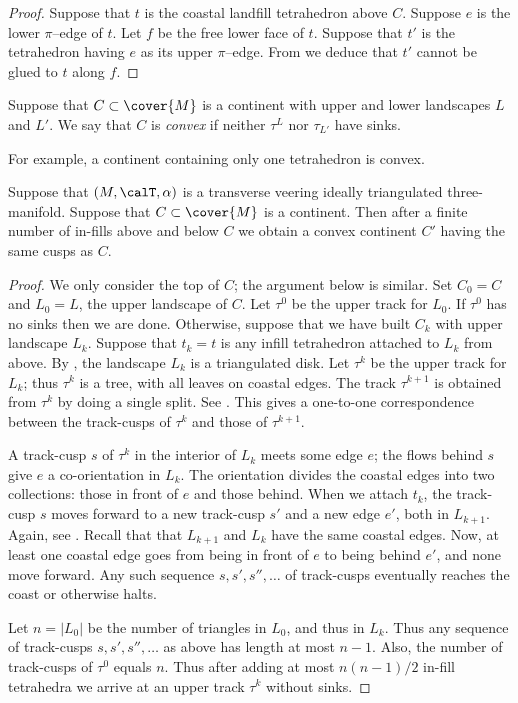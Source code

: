 \documentclass[12pt]{amsart}
\begin{document}
\begin{proof}
Suppose that $t$ is the coastal landfill tetrahedron above $C$.  Suppose $e$ is the lower $\pi$--edge of $t$.  Let $f$ be the free lower face of $t$.  Suppose that $t'$ is the tetrahedron having $e$ as its upper $\pi$--edge.  From  we deduce that $t'$ cannot be glued to $t$ along $f$. 
\end{proof}

\begin{definition}
\label{Def:Convex}
Suppose that $C \subset \cover{M}$ is a continent with upper and lower landscapes $L$ and $L'$.  We say that $C$ is \emph{convex} if neither $\tau^L$ nor $\tau_{L'}$ have sinks. 
\end{definition}

For example, a continent containing only one tetrahedron is convex. 

\begin{lemma}
\label{Lem:FiniteInFill}
Suppose that $(M, \calT, \alpha)$ is a transverse veering ideally triangulated three-manifold.  
Suppose that $C \subset \cover{M}$ is a continent.  Then after a finite number of in-fills above and below $C$ we obtain a convex continent $C'$ having the same cusps as $C$. 
\end{lemma}

\begin{proof}
We only consider the top of $C$; the argument below is similar.  Set $C_0 = C$ and $L_0 = L$, the upper landscape of $C$.  Let $\tau^0$ be the upper track for $L_0$.  If $\tau^0$ has no sinks then we are done.  Otherwise, suppose that we have built $C_k$ with upper landscape $L_k$.  Suppose that $t_k = t$ is any infill tetrahedron attached to $L_k$ from above.  By , the landscape $L_k$ is a triangulated disk.  Let $\tau^k$ be the upper track for $L_k$; thus $\tau^k$ is a tree, with all leaves on coastal edges.  The track $\tau^{k+1}$ is obtained from $\tau^k$ by doing a single split.  See .  This gives a one-to-one correspondence between the track-cusps of $\tau^k$ and those of $\tau^{k+1}$. 


A track-cusp $s$ of $\tau^k$ in the interior of $L_k$ meets some edge $e$; the flows behind $s$ give $e$ a co-orientation in $L_k$.  The orientation divides the coastal edges into two collections: those in front of $e$ and those behind.  When we attach $t_k$, the track-cusp $s$ moves forward to a new track-cusp $s'$ and a new edge $e'$, both in $L_{k+1}$. Again, see .  Recall that that $L_{k+1}$ and $L_k$ have the same coastal edges.
Now, at least one coastal edge goes from being in front of $e$ to being behind $e'$, and none move forward.  Any such sequence $s, s', s'', \ldots$ of track-cusps eventually reaches the coast or otherwise halts.

Let $n = |L_0|$ be the number of triangles in $L_0$, and thus in $L_k$.  Thus any sequence of track-cusps $s, s', s'', \ldots$ as above has length at most $n - 1$.  Also, the number of track-cusps of $\tau^0$ equals $n$.  Thus after adding at most $n(n-1)/2$ in-fill tetrahedra we arrive at an upper track $\tau^k$ without sinks.
\end{proof}
\end{document}
